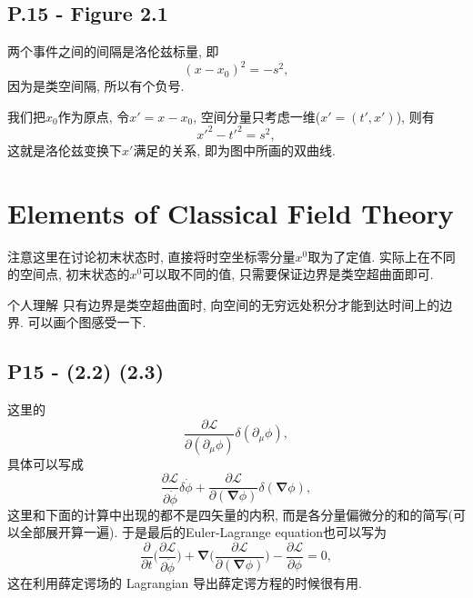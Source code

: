 \subsection{P.15 - Figure 2.1}

两个事件之间的间隔是洛伦兹标量, 即
\begin{equation}
  (x-x_0)^2 = -s^2,
\end{equation}
因为是类空间隔, 所以有个负号.

我们把$x_0$作为原点, 令$x'=x-x_0$, 空间分量只考虑一维($x'=(t',x')$), 则有
\begin{equation}
  x'^2-t'^2=s^2,
\end{equation}
这就是洛伦兹变换下$x'$满足的关系, 即为图中所画的双曲线.

\section{Elements of Classical Field Theory}

注意这里在讨论初末状态时, 直接将时空坐标零分量$x^0$取为了定值.
实际上在不同的空间点, 初末状态的$x^0$可以取不同的值, 只需要保证边界是类空超曲面即可.

\begin{mybox}{个人理解}
  只有边界是类空超曲面时, 向空间的无穷远处积分才能到达时间上的边界.
  可以画个图感受一下.
\end{mybox}

\subsection{P15 - (2.2) (2.3)}

这里的
\begin{equation}
  \frac{\partial \mathcal{L}}{\partial(\partial_\mu \phi)}\delta(\partial_\mu \phi),
\end{equation}
具体可以写成
\begin{equation}
  \frac{\partial \mathcal{L}}{\partial\dot\phi}\delta  \dot{\phi}+\frac{\partial \mathcal{L}}{\partial(\bm{\nabla} \phi)}\delta(\bm{\nabla} \phi),
\end{equation}
这里和下面的计算中出现的都不是四矢量的内积, 而是各分量偏微分的和的简写(可以全部展开算一遍).
于是最后的Euler-Lagrange equation也可以写为
\begin{equation}
  \frac{\partial}{\partial t}\biggl(\frac{\partial \mathcal{L}}{\partial\dot\phi}\biggr) + \bm{\nabla} \biggl(\frac{\partial \mathcal{L}}{\partial(\bm{\nabla} \phi)}\biggr) - \frac{\partial \mathcal{L}}{\partial \phi} = 0,
\end{equation}
这在利用薛定谔场的 Lagrangian 导出薛定谔方程的时候很有用.

